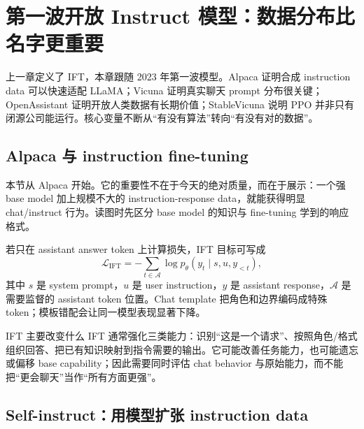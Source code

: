 \section{第一波开放 Instruct 模型：数据分布比名字更重要}

上一章定义了 IFT，本章跟随 2023 年第一波模型。Alpaca 证明合成 instruction data 可以快速适配 LLaMA；Vicuna 证明真实聊天 prompt 分布很关键；OpenAssistant 证明开放人类数据有长期价值；StableVicuna 说明 PPO 并非只有闭源公司能运行。核心变量不断从“有没有算法”转向“有没有对的数据”。

\subsection{Alpaca 与 instruction fine-tuning}

本节从 Alpaca 开始。它的重要性不在于今天的绝对质量，而在于展示：一个强 base model 加上规模不大的 instruction-response data，就能获得明显 chat/instruct 行为。读图时先区分 base model 的知识与 fine-tuning 学到的响应格式。



若只在 assistant answer token 上计算损失，IFT 目标可写成
\[
\mathcal{L}_{\mathrm{IFT}}=-\sum_{t\in\mathcal{A}}\log p_{\theta}(y_t\mid s,u,y_{<t}),
\]
其中 $s$ 是 system prompt，$u$ 是 user instruction，$y$ 是 assistant response，$\mathcal{A}$ 是需要监督的 assistant token 位置。Chat template 把角色和边界编码成特殊 token；模板错配会让同一模型表现显著下降。


\begin{importantbox}{IFT 主要改变什么}
IFT 通常强化三类能力：识别“这是一个请求”、按照角色/格式组织回答、把已有知识映射到指令需要的输出。它可能改善任务能力，也可能遗忘或偏移 base capability；因此需要同时评估 chat behavior 与原始能力，而不能把“更会聊天”当作“所有方面更强”。
\end{importantbox}


\subsection{Self-instruct：用模型扩张 instruction data}

